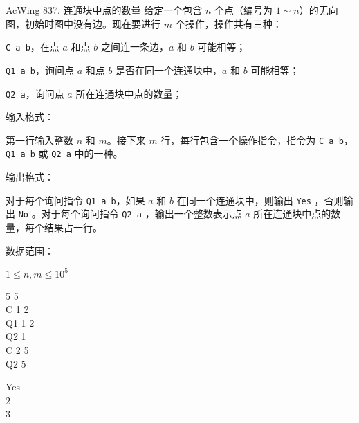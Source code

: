 \begin{titledbox}{AcWing 837. 连通块中点的数量}
    给定一个包含 $n$ 个点（编号为 $1 \sim n$）的无向图，初始时图中没有边。现在要进行 $m$ 个操作，操作共有三种：

    \lstinline{C a b}，在点 $a$ 和点 $b$ 之间连一条边，$a$ 和 $b$ 可能相等；

    \lstinline{Q1 a b}，询问点 $a$ 和点 $b$ 是否在同一个连通块中，$a$ 和 $b$ 可能相等；

    \lstinline{Q2 a}，询问点 $a$ 所在连通块中点的数量；

    输入格式：

    第一行输入整数 $n$ 和 $m$。接下来 $m$ 行，每行包含一个操作指令，指令为 \lstinline{C a b}，\lstinline{Q1 a b} 或 \lstinline{Q2 a} 中的一种。

    输出格式：

    对于每个询问指令 \lstinline{Q1 a b}，如果 $a$ 和 $b$ 在同一个连通块中，则输出 \lstinline{Yes} ，否则输出 \lstinline{No} 。对于每个询问指令 \lstinline{Q2 a} ，输出一个整数表示点 $a$ 所在连通块中点的数量，每个结果占一行。

    数据范围：

    $1 \le n,m \le 10^5$

    \begin{inputblock}
        5 5 \\
        C 1 2 \\
        Q1 1 2 \\
        Q2 1 \\
        C 2 5 \\
        Q2 5
    \end{inputblock}
    \begin{outputblock}
        Yes \\
        2 \\
        3
    \end{outputblock}
\end{titledbox}

